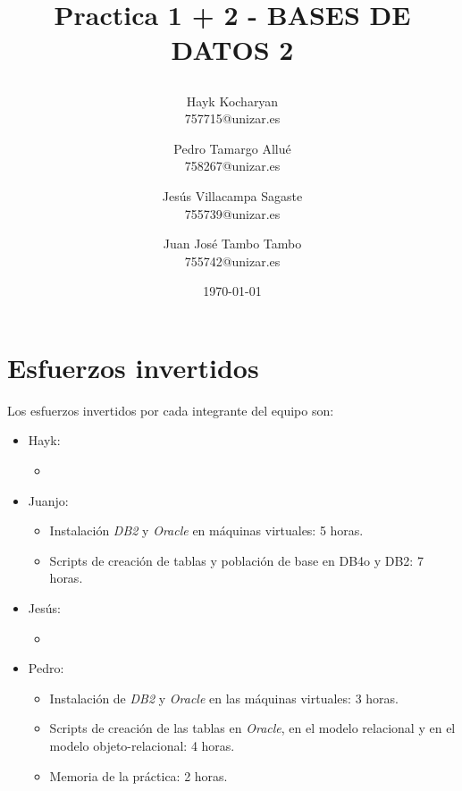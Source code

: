 \documentclass{article}
\begin{document}
\begin{titlepage}
	\title{
		\begin{Huge}
			Practica 1 + 2 - BASES DE DATOS 2
		\end{Huge}
	}
	\author{
	  Hayk Kocharyan\\
	  757715@unizar.es
	  \and
	  Pedro Tamargo Allué\\
	  758267@unizar.es
	  \and
	  Jesús Villacampa Sagaste\\
	  755739@unizar.es
	  \and
	  Juan José Tambo Tambo\\
	  755742@unizar.es
	}
	\date{\today}
	
	\clearpage\maketitle
	\thispagestyle{empty}
	\tableofcontents
	\listoffigures 
	
\end{titlepage}

\newpage 

\section{Esfuerzos invertidos}
Los esfuerzos invertidos por cada integrante del equipo son:
\begin{itemize}
\item Hayk:
\begin{itemize}
\item 
\end{itemize}

\item Juanjo:
\begin{itemize}
\item Instalación \emph{DB2} y \emph{Oracle} en máquinas virtuales: 5 horas.
\item Scripts de creación de tablas y población de base en DB4o y DB2: 7 horas.
\end{itemize}	

\item Jesús:
\begin{itemize}
\item 
\end{itemize}

\item Pedro: 
\begin{itemize}
\item Instalación de \emph{DB2} y \emph{Oracle} en las máquinas virtuales: 3 horas.
\item Scripts de creación de las tablas en \emph{Oracle}, en el modelo relacional y en el modelo objeto-relacional: 4 horas.
\item Memoria de la práctica: 2 horas.
\end{itemize}

\end{itemize}
\end{document}
